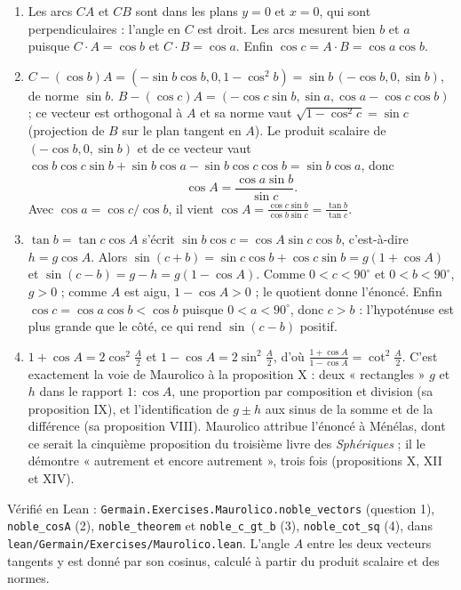 \documentclass[11pt,a4paper]{article}
\begin{document}
\begin{solution}
\begin{enumerate}
\item Les arcs $CA$ et $CB$ sont dans les plans $y = 0$ et $x = 0$, qui sont
  perpendiculaires : l'angle en $C$ est droit. Les arcs mesurent bien $b$ et $a$
  puisque $C \cdot A = \cos b$ et $C \cdot B = \cos a$. Enfin
  $\cos c = A \cdot B = \cos a \cos b$.
\item $C - (\cos b)A = (-\sin b\cos b, 0, 1 - \cos^2 b) = \sin b\,(-\cos b, 0,
  \sin b)$, de norme $\sin b$. $B - (\cos c)A = (-\cos c \sin b, \sin a,
  \cos a - \cos c \cos b)$ ; ce vecteur est orthogonal à $A$ et sa norme vaut
  $\sqrt{1 - \cos^2 c} = \sin c$ (projection de $B$ sur le plan tangent en $A$).
  Le produit scalaire de $(-\cos b, 0, \sin b)$ et de ce vecteur vaut
  $\cos b\cos c\sin b + \sin b\cos a - \sin b\cos c\cos b = \sin b\cos a$, donc
  \[
  \cos A = \frac{\cos a \sin b}{\sin c}.
  \]
  Avec $\cos a = \cos c / \cos b$, il vient
  $\cos A = \frac{\cos c \sin b}{\cos b \sin c} = \frac{\tan b}{\tan c}$.
\item $\tan b = \tan c \cos A$ s'écrit $\sin b \cos c = \cos A \sin c \cos b$,
  c'est-à-dire $h = g \cos A$. Alors
  $\sin(c+b) = \sin c\cos b + \cos c \sin b = g(1 + \cos A)$ et
  $\sin(c-b) = g - h = g(1 - \cos A)$. Comme $0 < c < 90^\circ$ et
  $0 < b < 90^\circ$, $g > 0$ ; comme $A$ est aigu, $1 - \cos A > 0$ ; le quotient
  donne l'énoncé. Enfin $\cos c = \cos a \cos b < \cos b$ puisque $0 < a < 90^\circ$,
  donc $c > b$ : l'hypoténuse est plus grande que le côté, ce qui rend
  $\sin(c-b)$ positif.
\item $1 + \cos A = 2\cos^2\frac{A}{2}$ et $1 - \cos A = 2\sin^2\frac{A}{2}$, d'où
  $\frac{1+\cos A}{1-\cos A} = \cot^2\frac{A}{2}$. C'est exactement la voie de
  Maurolico à la proposition X : deux « rectangles » $g$ et $h$ dans le rapport
  $1 : \cos A$, une proportion par composition et division (sa proposition IX),
  et l'identification de $g \pm h$ aux sinus de la somme et de la différence (sa
  proposition VIII). Maurolico attribue l'énoncé à Ménélas, dont ce serait la
  cinquième proposition du troisième livre des \emph{Sphériques} ; il le démontre
  « autrement et encore autrement », trois fois (propositions X, XII et XIV).
\end{enumerate}

Vérifié en Lean : \texttt{Germain.Exercises.Maurolico.noble\_vectors} (question 1),
\texttt{noble\_cosA} (2), \texttt{noble\_theorem} et \texttt{noble\_c\_gt\_b} (3),
\texttt{noble\_cot\_sq} (4), dans \texttt{lean/Germain/Exercises/Maurolico.lean}. L'angle $A$ entre les deux vecteurs
tangents y est donné par son cosinus, calculé à partir du produit scalaire et des normes.
\end{solution}
\end{document}
